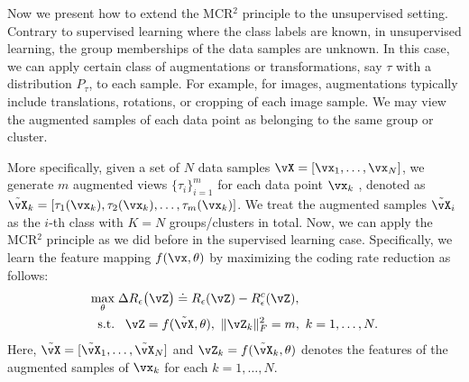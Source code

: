 \documentclass[../../book-main.tex]{subfiles}
\begin{document}
Now we present how to extend the MCR$^2$ principle to the
unsupervised setting. Contrary to supervised learning where the class
labels are known, in unsupervised learning, the group memberships of
the data samples are unknown. In this case, we can apply certain
class of augmentations or transformations, say $\tau$ with a
distribution $P_{\tau}$, to each sample. For example, for images,
augmentations typically include translations, rotations, or cropping
of each image sample. We may view the augmented samples of each data
point as belonging to the same group or cluster.

More specifically, given a set of $N$ data samples $\vX =
[\vx_1,\dots,\vx_N]$, we generate $m$ augmented views
$\{\tau_i\}_{i=1}^m$ for each data point $\vx_k$ , denoted as
$\tilde{\vX}_{k} = [\tau_1(\vx_k), \tau_2(\vx_k), \dots, \tau_m(\vx_k)]$.
We treat the augmented samples $\tilde{\vX}_{i}$ as the $i$-th class
with $K=N$ groups/clusters in total. Now, we can apply the MCR$^2$
principle as we did before in the supervised learning case.
Specifically, we learn the feature mapping $f(\vx,\theta)$ by
maximizing the coding rate reduction as follows:
\begin{equation}
    \begin{aligned}
        \max_{\theta } & \;  \Delta R_{\epsilon}\big(\vZ \big) \doteq
        R_{\epsilon}(\vZ) - R_{\epsilon}^c(\vZ ), \\
        \mbox{s.t.} & \ \ \, \vZ = f(\tilde{\vX}, \theta),\  \|\vZ_k\|_F^2
        = m,\ k=1,\dots,N.
    \end{aligned}
    \label{eqn:maximal-rate-reduction-unsupervised}
\end{equation}
Here, $\tilde{\vX} = [\tilde{\vX}_1,\dots,\tilde{\vX}_N]$ and $\vZ_k =
f(\tilde{\vX}_k,\theta)$ denotes the features of the augmented samples
of $\vx_k$ for each $k=1,\dots,N$.
\end{document}

